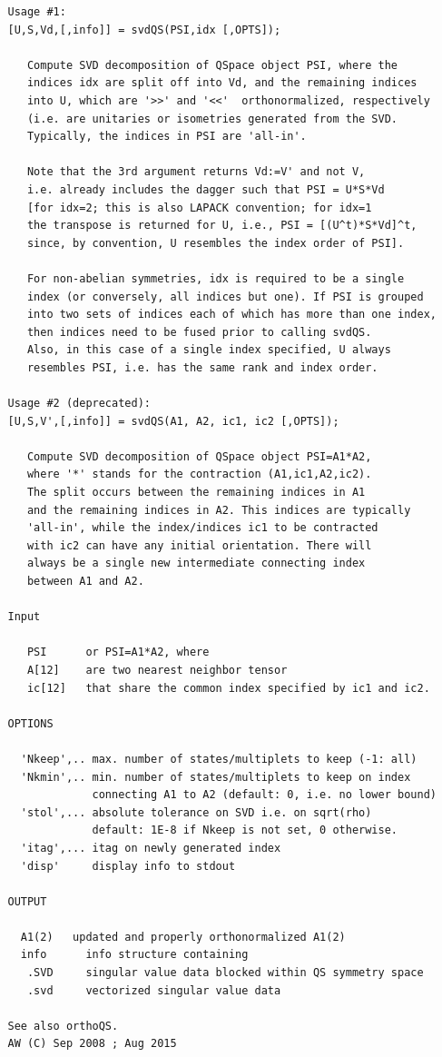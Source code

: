 \documentclass[twoside,12pt]{article}
\begin{document}
\begin{verbatim}
   Usage #1:
   [U,S,Vd,[,info]] = svdQS(PSI,idx [,OPTS]);
 
      Compute SVD decomposition of QSpace object PSI, where the
      indices idx are split off into Vd, and the remaining indices
      into U, which are '>>' and '<<'  orthonormalized, respectively
      (i.e. are unitaries or isometries generated from the SVD.
      Typically, the indices in PSI are 'all-in'.
 
      Note that the 3rd argument returns Vd:=V' and not V,
      i.e. already includes the dagger such that PSI = U*S*Vd
      [for idx=2; this is also LAPACK convention; for idx=1
      the transpose is returned for U, i.e., PSI = [(U^t)*S*Vd]^t,
      since, by convention, U resembles the index order of PSI].
 
      For non-abelian symmetries, idx is required to be a single
      index (or conversely, all indices but one). If PSI is grouped
      into two sets of indices each of which has more than one index,
      then indices need to be fused prior to calling svdQS.
      Also, in this case of a single index specified, U always
      resembles PSI, i.e. has the same rank and index order.
 
   Usage #2 (deprecated):
   [U,S,V',[,info]] = svdQS(A1, A2, ic1, ic2 [,OPTS]);
 
      Compute SVD decomposition of QSpace object PSI=A1*A2,
      where '*' stands for the contraction (A1,ic1,A2,ic2).
      The split occurs between the remaining indices in A1
      and the remaining indices in A2. This indices are typically
      'all-in', while the index/indices ic1 to be contracted
      with ic2 can have any initial orientation. There will
      always be a single new intermediate connecting index
      between A1 and A2.
 
   Input
 
      PSI      or PSI=A1*A2, where
      A[12]    are two nearest neighbor tensor
      ic[12]   that share the common index specified by ic1 and ic2.
 
   OPTIONS
 
     'Nkeep',.. max. number of states/multiplets to keep (-1: all)
     'Nkmin',.. min. number of states/multiplets to keep on index
                connecting A1 to A2 (default: 0, i.e. no lower bound)
     'stol',... absolute tolerance on SVD i.e. on sqrt(rho)
                default: 1E-8 if Nkeep is not set, 0 otherwise.
     'itag',... itag on newly generated index
     'disp'     display info to stdout
 
   OUTPUT
 
     A1(2)   updated and properly orthonormalized A1(2)
     info      info structure containing
      .SVD     singular value data blocked within QS symmetry space
      .svd     vectorized singular value data
 
   See also orthoQS.
   AW (C) Sep 2008 ; Aug 2015
\end{verbatim}
\end{document}
